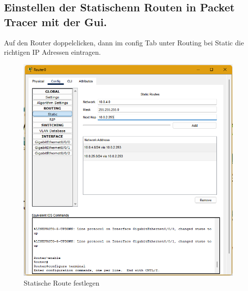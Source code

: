 \documentclass[a4paper]{article}
\begin{document}
\subsection{Einstellen der Statischenn Routen in Packet Tracer mit der Gui.}
Auf den Router doppelclicken, dann im config Tab unter Routing bei Static die richtigen IP Adressen eintragen.
\begin{figure}[h]
	\centering
	\includegraphics[scale=0.5]{ptgui.png}
	\caption{Statische Route festlegen}
\end{figure}
\newpage
\end{document}

